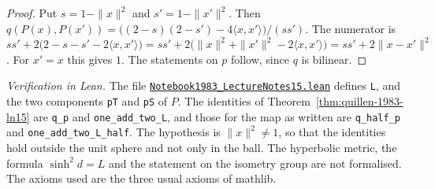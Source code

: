 \begin{proof}
Put $s = 1 - \|x\|^2$ and $s' = 1 - \|x'\|^2$. Then $q(P(x), P(x')) = \bigl((2 - s)(2 - s') - 4\langle x, x'\rangle\bigr)/(ss')$. The numerator is $ss' + 2\bigl(2 - s - s' - 2\langle x, x'\rangle\bigr) = ss' + 2\bigl(\|x\|^2 + \|x'\|^2 - 2\langle x, x'\rangle\bigr) = ss' + 2\|x - x'\|^2$. For $x' = x$ this gives $1$. The statements on $p$ follow, since $q$ is bilinear.
\end{proof}

\emph{Verification in Lean.} The file \href{\leanblobmain/Notebook1983_LectureNotes15.lean}{\texttt{Notebook1983\_\allowbreak{}LectureNotes15.\allowbreak{}lean}} defines \texttt{L}, and the two components \texttt{pT} and \texttt{pS} of $P$. The identities of Theorem~\ref{thm:quillen-1983-ln15} are \texttt{q\_p} and \texttt{one\_add\_two\_L}, and those for the map as written are \texttt{q\_half\_p} and \texttt{one\_add\_two\_L\_half}. The hypothesis is $\|x\|^2 \ne 1$, so that the identities hold outside the unit sphere and not only in the ball. The hyperbolic metric, the formula $\sinh^2 d = L$ and the statement on the isometry group are not formalised. The axioms used are the three usual axioms of mathlib.

